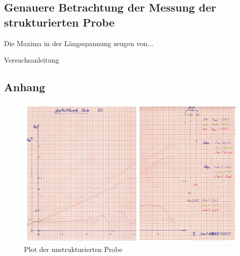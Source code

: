 \documentclass[10pt,a4paper]{article}
\begin{document}
\subsection{Genauere Betrachtung der Messung der strukturierten Probe}
Die Maxima in der Längsspannung zeugen von...
\\



\tableofcontents

\begin{thebibliography}{xxxxxxxxxxxxxxxxxxx}
   Versuchsanleitung
\end{thebibliography}
\pagebreak

\begin {appendix}
\section*{Anhang}

\begin{figure}[hbtp]
\centering
	\caption{Plot der unstrukturierten Probe}
\includegraphics[scale=0.5]{plot_unstrukt_cropped.pdf}
\end{figure}

\end{appendix}
\end{document}
